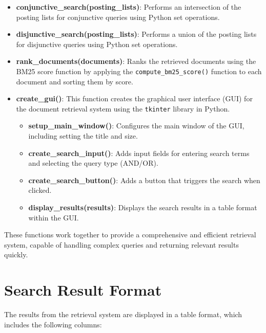 \documentclass[a4paper,10pt]{article}
\begin{document}
\begin{itemize}
    \item \textbf{conjunctive\_search(posting\_lists)}: Performs an intersection of the posting lists for conjunctive queries using Python set operations.
    
    \item \textbf{disjunctive\_search(posting\_lists)}: Performs a union of the posting lists for disjunctive queries using Python set operations.
    
    \item \textbf{rank\_documents(documents)}: Ranks the retrieved documents using the BM25 score function by applying the \texttt{compute\_bm25\_score()} function to each document and sorting them by score.
    
    \item \textbf{create\_gui()}: This function creates the graphical user interface (GUI) for the document retrieval system using the \texttt{tkinter} library in Python.
    \begin{itemize}
        \item \textbf{setup\_main\_window()}: Configures the main window of the GUI, including setting the title and size.
        \item \textbf{create\_search\_input()}: Adds input fields for entering search terms and selecting the query type (AND/OR).
        \item \textbf{create\_search\_button()}: Adds a button that triggers the search when clicked.
        \item \textbf{display\_results(results)}: Displays the search results in a table format within the GUI.
    \end{itemize}
\end{itemize}

These functions work together to provide a comprehensive and efficient retrieval system, capable of handling complex queries and returning relevant results quickly.

\section{Search Result Format}

The results from the retrieval system are displayed in a table format, which includes the following columns:
\end{document}
